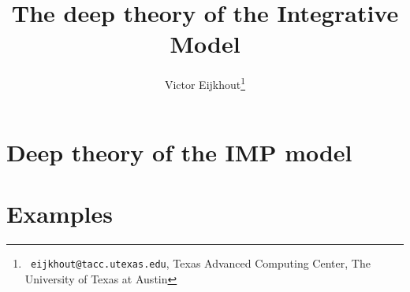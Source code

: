 \documentclass[11pt,fleqn,preprint]{taccreport}
\title[IMP deep theory]{The deep theory of the Integrative Model}
\author[Eijkhout]{Victor Eijkhout\thanks{{\tt
      eijkhout@tacc.utexas.edu}, Texas Advanced Computing Center, The
    University of Texas at Austin}}
\begin{document}
\maketitle

\begin{abstract}

\end{abstract}

\section{Deep theory of the IMP model}
\label{sec:model}


\section{Examples}




\end{document}
